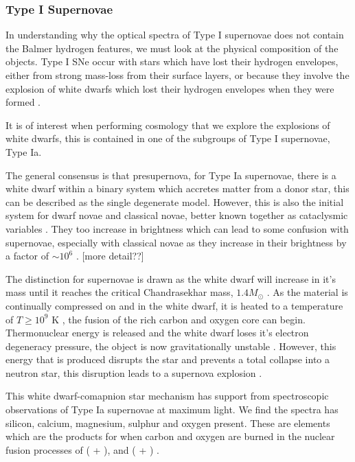 \documentclass[twocolumn]{revtex4}
\begin{document}
\vspace{-3ex}
\subsubsection{Type I Supernovae}
\vspace{-2ex}
In understanding why the optical spectra of Type I supernovae does not contain the Balmer hydrogen features, we must look at the physical composition of the objects. Type I SNe occur with stars which have lost their hydrogen envelopes, either from strong mass-loss from their surface layers, or because they involve the explosion of white dwarfs which lost their hydrogen envelopes when they were formed \cite{longair}. 

It is of interest when performing cosmology that we explore the explosions of white dwarfs, this is contained in one of the subgroups of Type I supernovae, Type Ia.

The general consensus is that presupernova, for Type Ia supernovae, there is a white dwarf within a binary system which accretes matter from a donor star, this can be described as the single degenerate model. However, this is also the initial system for dwarf novae and classical novae, better known together as cataclysmic variables \cite{mod_ast}. They too increase in brightness which can lead to some confusion with supernovae, especially with classical novae as they increase in their brightness by a factor of  $\sim 10^6$ \cite{mod_ast}. [more detail??]

The distinction for supernovae is drawn as the white dwarf will increase in it's mass until it reaches the critical Chandrasekhar mass, $1.4 M_{\odot}$ \cite{posn, longair}. As the material is continually compressed on and in the white dwarf, it is heated to a temperature of $T \geq 10^9$ K \cite{longair}, the fusion of the rich carbon and oxygen core can begin. Thermonuclear energy is released and the white dwarf loses it's electron degeneracy pressure, the object is now gravitationally unstable \cite{longair}. However, this energy that is produced disrupts the star and prevents a total collapse into a neutron star, this disruption leads to a supernova explosion \cite{posn}. 

This white dwarf-comapnion star mechanism has support from spectroscopic observations of Type Ia supernovae at maximum light. We find the spectra has silicon, calcium, magnesium, sulphur and oxygen present. These are elements which are the products for when carbon and oxygen are burned in the nuclear fusion processes of ( + ), and ( + ) \cite{longair}.
\end{document}
